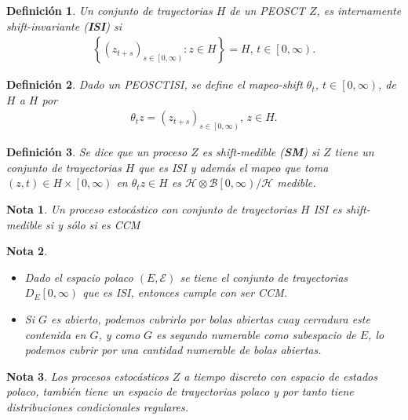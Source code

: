 \documentclass{article}
\newtheorem{Def}{Definición}[section]
\newtheorem{Note}{Nota}[section]
\numberwithin{equation}{section}
\begin{document}
\begin{Def}
Un conjunto de trayectorias $H$ de un PEOSCT $Z$, es internamente shift-invariante (\textbf{ISI}) si 
\begin{eqnarray}
\left\{\left(z_{t+s}\right)_{s\in\left[0,\infty\right)}:z\in H\right\}=H\textrm{, }t\in\left[0,\infty\right).
\end{eqnarray}
\end{Def}


\begin{Def}
Dado un PEOSCTISI, se define el mapeo-shift $\theta_{t}$, $t\in\left[0,\infty\right)$, de $H$ a $H$ por 
\begin{eqnarray}
\theta_{t}z=\left(z_{t+s}\right)_{s\in\left[0,\infty\right)}\textrm{, }z\in H.
\end{eqnarray}
\end{Def}

\begin{Def}
Se dice que un proceso $Z$ es shift-medible (\textbf{SM}) si $Z$ tiene un conjunto de trayectorias $H$ que es ISI y adem\'as el mapeo que toma $\left(z,t\right)\in H\times\left[0,\infty\right)$ en $\theta_{t}z\in H$ es $\mathcal{H}\otimes\mathcal{B}\left[0,\infty\right)/\mathcal{H}$ medible.
\end{Def}

\begin{Note}
Un proceso estoc\'astico con conjunto de trayectorias $H$ ISI es shift-medible si y s\'olo si es CCM
\end{Note}

\begin{Note}
\begin{itemize}
\item Dado el espacio polaco $\left(E,\mathcal{E}\right)$ se tiene el  conjunto de trayectorias $D_{E}\left[0,\infty\right)$ que es ISI, entonces cumple con ser CCM.

\item Si $G$ es abierto, podemos cubrirlo por bolas abiertas cuay cerradura este contenida en $G$, y como $G$ es segundo numerable como subespacio de $E$, lo podemos cubrir por una cantidad numerable de bolas abiertas.

\end{itemize}
\end{Note}


\begin{Note}
Los procesos estoc\'asticos $Z$ a tiempo discreto con espacio de estados polaco, tambi\'en tiene un espacio de trayectorias polaco y por tanto tiene distribuciones condicionales regulares.
\end{Note}
\end{document}

